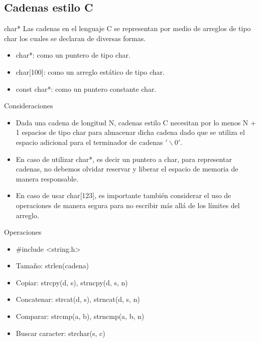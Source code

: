 \documentclass[aspectratio=169]{beamer}
\begin{document}
\subsection{Cadenas estilo C}
\begin{frame}{char*}
Las cadenas en el lenguaje C se representan por medio de arreglos de tipo char los cuales se declaran de diversas formas.
\begin{itemize}
\item char*: como un puntero de tipo char.
\item char[100]: como un arreglo estático de tipo char.
\item const char*: como un puntero constante char.
\end{itemize}
\end{frame}
\begin{frame}{Consideraciones}
\begin{itemize}
\item Dada una cadena de longitud N, cadenas estilo C necesitan por lo menos N + 1 espacios de tipo char para almacenar dicha cadena dado que se utiliza el espacio adicional para el terminador de cadenas $'\backslash 0'$.
\item En caso de utilizar char*, es decir un puntero a char, para representar cadenas, no debemos olvidar reservar y liberar el espacio de memoria de manera responsable.
\item En caso de usar char[123], es importante también considerar el uso de operaciones de manera segura para no escribir más allá de los límites del arreglo.
\end{itemize}
\end{frame}
\begin{frame}{Operaciones}
\begin{itemize}
\item \#include <string.h> 
\item Tamaño: strlen(cadena)
\item Copiar: strcpy(d, s), strncpy(d, s, n)
\item Concatenar: strcat(d, s), strncat(d, s, n)
\item Comparar: strcmp(a, b), strncmp(a, b, n)
\item Buscar caracter: strchar(s, c)
\end{itemize}
\end{frame}
\end{document}
